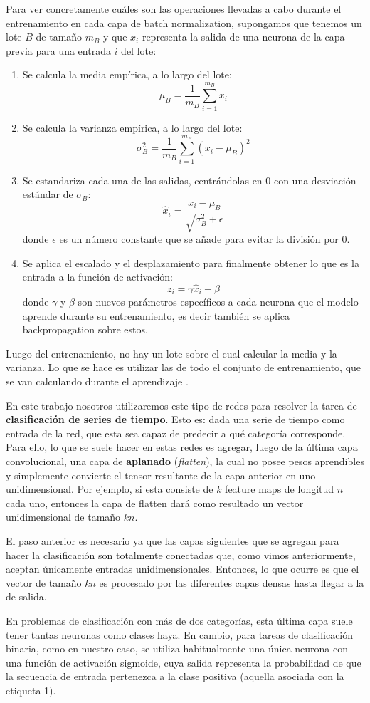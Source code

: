 \documentclass[../../main.tex]{subfiles}
\begin{document}
Para ver concretamente cuáles son las operaciones llevadas a cabo durante el entrenamiento
en cada capa de batch normalization, supongamos que tenemos un lote \(B\) de tamaño
\(m_B\) y que \(x_i\) representa la salida de una neurona de la capa previa para una
entrada \(i\) del lote:
\begin{enumerate}[label=\textbf{\arabic*.}]
    \item Se calcula la media empírica, a lo largo del lote:
    \[ \mu_B = \frac{1}{m_B} \sum_{i=1}^{m_B} x_i \]
    \item Se calcula la varianza empírica, a lo largo del lote:
    \[ \sigma_B^2 = \frac{1}{m_B} \sum_{i=1}^{m_B} \left( x_i - \mu_B \right)^2 \]
    \item Se estandariza cada una de las salidas, centrándolas en 0 con una desviación
    estándar de \(\sigma_B\):
    \[ \hat{x}_i = \frac{x_i - \mu_B}{\sqrt{\sigma_B^2 + \epsilon}} \]
    donde \(\epsilon\) es un número constante que se añade para evitar la división por 0.
    \item Se aplica el escalado y el desplazamiento para finalmente obtener lo que es la
    entrada a la función de activación:
    \[ z_i = \gamma \hat{x}_i + \beta \] donde \(\gamma\) y \(\beta\) son nuevos
    parámetros específicos a cada neurona que el modelo aprende durante su entrenamiento,
    es decir también se aplica backpropagation sobre estos.
\end{enumerate}

Luego del entrenamiento, no hay un lote sobre el cual calcular la media y la varianza.
Lo que se hace es utilizar las de todo el conjunto de entrenamiento, que se van
calculando durante el aprendizaje \cite{hands-on-ML-sklearn-tf}.

\bigskip
En este trabajo nosotros utilizaremos este tipo de redes para resolver la tarea de
\textbf{clasificación de series de tiempo}. Esto es: dada una serie de tiempo como entrada
de la red, que esta sea capaz de predecir a qué categoría corresponde. Para ello, lo que
se suele hacer en estas redes es agregar, luego de la última capa convolucional, una capa
de \textbf{aplanado} (\textit{flatten}), la cual no posee pesos aprendibles y simplemente
convierte el tensor resultante de la capa anterior en uno unidimensional. Por ejemplo, si
esta consiste de \(k\) feature maps de longitud \(n\) cada uno, entonces la capa de
flatten dará como resultado un vector unidimensional de tamaño \(kn\).

El paso anterior es necesario ya que las capas siguientes que se agregan para hacer la
clasificación son totalmente conectadas que, como vimos anteriormente, aceptan únicamente
entradas unidimensionales. Entonces, lo que ocurre es que el vector de tamaño \(kn\) es
procesado por las diferentes capas densas hasta llegar a la de salida.

En problemas de clasificación con más de dos categorías, esta última capa suele tener
tantas neuronas como clases haya. En cambio, para tareas de clasificación binaria, como en
nuestro caso, se utiliza habitualmente una única neurona con una función de activación
sigmoide, cuya salida representa la probabilidad de que la secuencia de entrada pertenezca
a la clase positiva (aquella asociada con la etiqueta 1).
\end{document}
